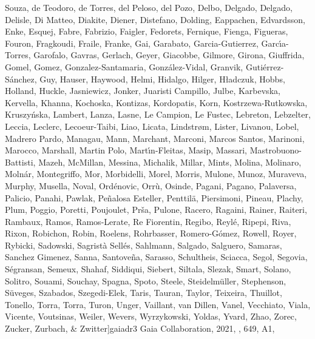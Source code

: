 \documentclass[twocolumn]{aastex631}
\begin{document}
\begin{thebibliography}{}
{{  Souza}, {de Teodoro}, {de Torres}, {del Peloso}, {del Pozo}, {Delbo},
  {Delgado}, {Delgado}, {Delisle}, {Di Matteo}, {Diakite}, {Diener},
  {Distefano}, {Dolding}, {Eappachen}, {Edvardsson}, {Enke}, {Esquej}, {Fabre},
  {Fabrizio}, {Faigler}, {Fedorets}, {Fernique}, {Fienga}, {Figueras},
  {Fouron}, {Fragkoudi}, {Fraile}, {Franke}, {Gai}, {Garabato},
  {Garcia-Gutierrez}, {Garc{\'\i}a-Torres}, {Garofalo}, {Gavras}, {Gerlach},
  {Geyer}, {Giacobbe}, {Gilmore}, {Girona}, {Giuffrida}, {Gomel}, {Gomez},
  {Gonzalez-Santamaria}, {Gonz{\'a}lez-Vidal}, {Granvik},
  {Guti{\'e}rrez-S{\'a}nchez}, {Guy}, {Hauser}, {Haywood}, {Helmi}, {Hidalgo},
  {Hilger}, {H{\l}adczuk}, {Hobbs}, {Holland}, {Huckle}, {Jasniewicz},
  {Jonker}, {Juaristi Campillo}, {Julbe}, {Karbevska}, {Kervella}, {Khanna},
  {Kochoska}, {Kontizas}, {Kordopatis}, {Korn}, {Kostrzewa-Rutkowska},
  {Kruszy{\'n}ska}, {Lambert}, {Lanza}, {Lasne}, {Le Campion}, {Le Fustec},
  {Lebreton}, {Lebzelter}, {Leccia}, {Leclerc}, {Lecoeur-Taibi}, {Liao},
  {Licata}, {Lindstr{\o}m}, {Lister}, {Livanou}, {Lobel}, {Madrero Pardo},
  {Managau}, {Mann}, {Marchant}, {Marconi}, {Marcos Santos}, {Marinoni},
  {Marocco}, {Marshall}, {Martin Polo}, {Mart{\'\i}n-Fleitas}, {Masip},
  {Massari}, {Mastrobuono-Battisti}, {Mazeh}, {McMillan}, {Messina},
  {Michalik}, {Millar}, {Mints}, {Molina}, {Molinaro}, {Moln{\'a}r},
  {Montegriffo}, {Mor}, {Morbidelli}, {Morel}, {Morris}, {Mulone}, {Munoz},
  {Muraveva}, {Murphy}, {Musella}, {Noval}, {Ord{\'e}novic}, {Orr{\`u}},
  {Osinde}, {Pagani}, {Pagano}, {Palaversa}, {Palicio}, {Panahi}, {Pawlak},
  {Pe{\~n}alosa Esteller}, {Penttil{\"a}}, {Piersimoni}, {Pineau}, {Plachy},
  {Plum}, {Poggio}, {Poretti}, {Poujoulet}, {Pr{\v{s}}a}, {Pulone}, {Racero},
  {Ragaini}, {Rainer}, {Raiteri}, {Rambaux}, {Ramos}, {Ramos-Lerate}, {Re
  Fiorentin}, {Regibo}, {Reyl{\'e}}, {Ripepi}, {Riva}, {Rixon}, {Robichon},
  {Robin}, {Roelens}, {Rohrbasser}, {Romero-G{\'o}mez}, {Rowell}, {Royer},
  {Rybicki}, {Sadowski}, {Sagrist{\`a} Sell{\'e}s}, {Sahlmann}, {Salgado},
  {Salguero}, {Samaras}, {Sanchez Gimenez}, {Sanna}, {Santove{\~n}a},
  {Sarasso}, {Schultheis}, {Sciacca}, {Segol}, {Segovia}, {S{\'e}gransan},
  {Semeux}, {Shahaf}, {Siddiqui}, {Siebert}, {Siltala}, {Slezak}, {Smart},
  {Solano}, {Solitro}, {Souami}, {Souchay}, {Spagna}, {Spoto}, {Steele},
  {Steidelm{\"u}ller}, {Stephenson}, {S{\"u}veges}, {Szabados}, {Szegedi-Elek},
  {Taris}, {Tauran}, {Taylor}, {Teixeira}, {Thuillot}, {Tonello}, {Torra},
  {Torra}, {Turon}, {Unger}, {Vaillant}, {van Dillen}, {Vanel}, {Vecchiato},
  {Viala}, {Vicente}, {Voutsinas}, {Weiler}, {Wevers}, {Wyrzykowski}, {Yoldas},
  {Yvard}, {Zhao}, {Zorec}, {Zucker}, {Zurbach}, \& {Zwitter}}]{gaiadr3}
{Gaia Collaboration}, 2021, \aap, 649, A1, 


\end{thebibliography}
\end{document}
